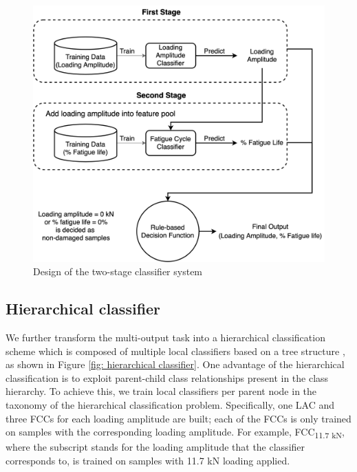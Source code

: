 \begin{figure}[tb]
    \centering
    \includegraphics[width=0.9\linewidth]{fig/two-stage_classifier.png}
    \caption{Design of the two-stage classifier system}
    \label{fig: two-stage classifier}
\end{figure}

\subsection{Hierarchical classifier}
We further transform the multi-output task into a hierarchical classification scheme which is composed of multiple local classifiers based on a tree structure \cite{hierarchical-Silla2011}, as shown in Figure \ref{fig: hierarchical classifier}. One advantage of the hierarchical classification is to exploit parent-child class relationships present in the class hierarchy. To achieve this, we train local classifiers per parent node in the taxonomy of the hierarchical classification problem. Specifically, one LAC and three FCCs for each loading amplitude are built; each of the FCCs is only trained on samples with the corresponding loading amplitude. For example, FCC\textsubscript{11.7 kN}, where the subscript stands for the loading amplitude that the classifier corresponds to, is trained on samples with 11.7 kN loading applied. 

